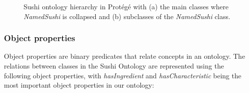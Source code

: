 \documentclass[a4paper]{article}
\theoremstyle{plain}
\theoremstyle{definition}
\begin{document}
    \begin{figure}[hbt]
        \centering
        \caption{Sushi ontology hierarchy in Protégé with (a) the main classes where \textit{NamedSushi} is collapsed and (b) subclasses of the \textit{NamedSushi} class.}
        \label{fig:hierarchies}
    \end{figure}

    \subsubsection{Object properties}
    Object properties are binary predicates that relate concepts in an ontology. The relations between classes in the Sushi Ontology are represented using the following object properties, with \textit{hasIngredient} and \textit{hasCharacteristic} being the most important object properties in our ontology:
\end{document}

